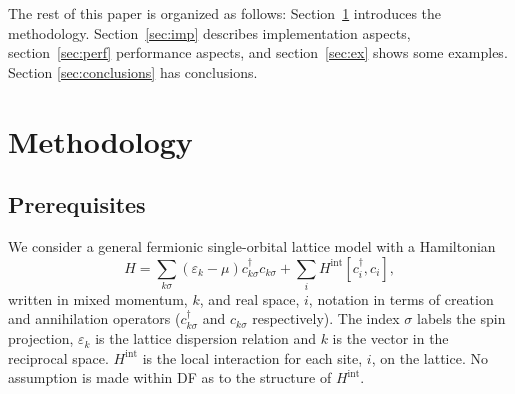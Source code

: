 \documentclass[3p,times,procedia]{elsarticle}
\begin{document}
The rest of this paper is organized as follows: Section~\ref{sec:meth} introduces the methodology. Section~\ref{sec:imp} describes  implementation aspects, section~\ref{sec:perf} performance aspects, and section~\ref{sec:ex} shows some examples. Section \ref{sec:conclusions} has conclusions.

\section{Methodology}\label{sec:meth}
\subsection{Prerequisites}
We consider a general fermionic single-orbital lattice model with a Hamiltonian
\begin{equation}
H = \sum_{k\sigma} (\varepsilon_k - \mu) c^\dagger_{k\sigma} c_{k\sigma} + \sum_i H^{\mathrm{int}} [c^\dagger_i, c_i],
\end{equation}
written in mixed momentum, $k$, and real space, $i$, notation in terms of creation and annihilation operators ($c^\dagger_{k\sigma}$ and $c_{k\sigma}$ respectively).  The index $\sigma$ labels the spin projection, $\varepsilon_k$ is the lattice dispersion relation and $k$ is the vector in the reciprocal space. 
$H^{\mathrm{int}}$ is the local interaction for each site, $i$, on the lattice. 
No assumption is made within DF as to the structure of $H^{\mathrm{int}}$.  %
\end{document}
